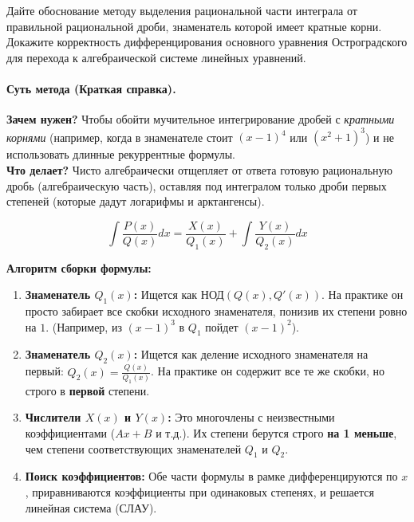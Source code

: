 \clearpage
\section*{}

{Дайте обоснование методу выделения рациональной части интеграла от правильной рациональной дроби, знаменатель которой имеет кратные корни. Докажите корректность дифференцирования основного уравнения Остроградского для перехода к алгебраической системе линейных уравнений.}

\paragraph{Суть метода (Краткая справка).}
\textbf{Зачем нужен?} Чтобы обойти мучительное интегрирование дробей с \textit{кратными корнями} (например, когда в знаменателе стоит $(x-1)^4$ или $(x^2+1)^3$) и не использовать длинные рекуррентные формулы.
\\ \textbf{Что делает?} Чисто алгебраически отщепляет от ответа готовую рациональную дробь (алгебраическую часть), оставляя под интегралом только дроби первых степеней (которые дадут логарифмы и арктангенсы).

\begin{tcolorbox}[colback=white, colframe=black, boxrule=0.5pt, arc=0pt, borderline={0.5pt}{0pt}{black, dashed}]
    \centering
    $$ \int \frac{P(x)}{Q(x)} dx = \frac{X(x)}{Q_1(x)} + \int \frac{Y(x)}{Q_2(x)} dx $$
\end{tcolorbox}

\textbf{Алгоритм сборки формулы:}
\begin{enumerate}
    \item \textbf{Знаменатель $Q_1(x)$:} Ищется как $\text{НОД}(Q(x), Q'(x))$. На практике он просто забирает все скобки исходного знаменателя, понизив их степени ровно на $1$. (Например, из $(x-1)^3$ в $Q_1$ пойдет $(x-1)^2$).
    \item \textbf{Знаменатель $Q_2(x)$:} Ищется как деление исходного знаменателя на первый: $Q_2(x) = \frac{Q(x)}{Q_1(x)}$. На практике он содержит все те же скобки, но строго в \textbf{первой} степени.
    \item \textbf{Числители $X(x)$ и $Y(x)$:} Это многочлены с неизвестными коэффициентами ($Ax+B$ и т.д.). Их степени берутся строго \textbf{на 1 меньше}, чем степени соответствующих знаменателей $Q_1$ и $Q_2$.
    \item \textbf{Поиск коэффициентов:} Обе части формулы в рамке дифференцируются по $x$, приравниваются коэффициенты при одинаковых степенях, и решается линейная система (СЛАУ).
\end{enumerate}

